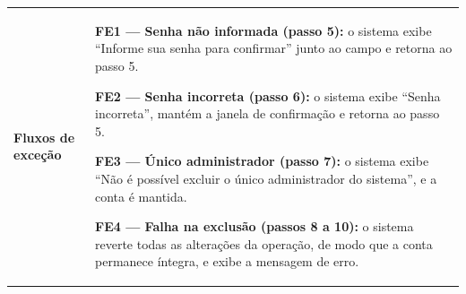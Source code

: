 \documentclass[12pt,a4paper]{article}
\begin{document}
\begin{longtable}{|p{}|p{}|}
\textbf{Fluxos de exceção} &
\noindent \textbf{FE1 — Senha não informada (passo 5):} o sistema exibe ``Informe sua senha para confirmar'' junto ao campo e retorna ao passo 5.
\par\smallskip\noindent \textbf{FE2 — Senha incorreta (passo 6):} o sistema exibe ``Senha incorreta'', mantém a janela de confirmação e retorna ao passo 5.
\par\smallskip\noindent \textbf{FE3 — Único administrador (passo 7):} o sistema exibe ``Não é possível excluir o único administrador do sistema'', e a conta é mantida.
\par\smallskip\noindent \textbf{FE4 — Falha na exclusão (passos 8 a 10):} o sistema reverte todas as alterações da operação, de modo que a conta permanece íntegra, e exibe a mensagem de erro. \\
\end{longtable}
\end{document}

